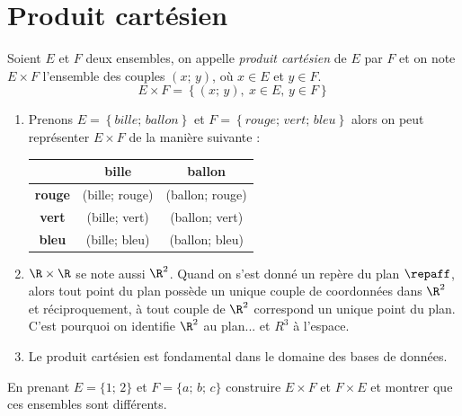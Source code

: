 \documentclass[a4paper,12pt,french]{book}
\begin{document}
\section{Produit cartésien}

\begin{definition}
Soient $E$ et $F$ deux ensembles, on appelle \textit{produit cartésien} de $E$ par $F$ et on note $E\times F$ l'ensemble des couples $(x;\,y)$, où $x\in E$ et $y\in F$.
$$E\times F = \left\{ (x;\,y),\:x\in E,\,y\in F\right\}$$
\end{definition}

\begin{exemple}[s]
\begin{enumerate}[--]
	\item 	Prenons $E=\left\{bille;\,ballon\right\}$ et $F=\left\{rouge;\,vert;\,bleu\right\}$ alors on peut représenter $E\times F$ de la manière suivante :

	\begin{center}
	\begin{tabular}{|c|c|c|}
	\hline
	 & \cellcolor{lightgray}\textbf{bille} &\cellcolor{lightgray}\textbf{ ballon} \\
	\hline
	\cellcolor{lightgray}\textbf{rouge} & (bille; rouge) & (ballon; rouge) \\
	\hline
	\cellcolor{lightgray}\textbf{vert} & (bille; vert) & (ballon; vert) \\
	\hline
	\cellcolor{lightgray}\textbf{bleu} & (bille; bleu) & (ballon; bleu) \\
	\hline
	\end{tabular}
	\end{center}

	\item 	$\R\times\R$ se note aussi $\R^2$. Quand on s'est donné un repère du plan $\repaff$, alors tout point du plan possède un unique couple de coordonnées dans $\R^2$ et réciproquement, à tout couple de $\R^2$ correspond un unique point du plan. C'est pourquoi on identifie $\R^2$ au plan... et $R^3$ à l'espace.
	\item 	Le produit cartésien est fondamental dans le domaine des bases de données.
\end{enumerate}\end{exemple}

\begin{exercice}[]
En prenant $E=\{1;\,2\}$ et $F=\{a;\,b;\,c\}$ construire $E\times F$ et $F\times E$ et montrer que ces ensembles sont différents.
\end{exercice}
\end{document}
